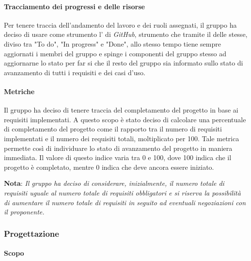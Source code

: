 \paragraph{Tracciamento dei progressi e delle risorse}
Per tenere traccia dell'andamento del lavoro e dei ruoli assegnati, il gruppo ha deciso di usare come strumento 
l' di \emph{GitHub}, strumento che tramite il  delle 
 stesse, diviso tra "To do", "In progress" e "Done", allo stesso tempo tiene sempre aggiornati i 
membri del gruppo e spinge i componenti del gruppo stesso ad aggiornarne lo stato per far si che il resto del gruppo 
sia informato sullo stato di avanzamento di tutti i requisiti e dei casi d'uso.

\paragraph{Metriche}

Il gruppo ha deciso di tenere traccia del completamento del progetto in base ai requisiti implementati. A questo scopo è 
stato deciso di calcolare una percentuale di completamento del progetto come il rapporto tra il numero di requisiti 
implementati e il numero dei requisiti totali, moltiplicato per 100. Tale metrica permette così di individuare lo stato 
di avanzamento del progetto in maniera immediata. Il valore di questo indice varia tra 0 e 100, dove 100 indica che il 
progetto è completato, mentre 0 indica che deve ancora essere iniziato.
\begin{center}
    \textbf{Nota}: \emph{Il gruppo ha deciso di considerare, inizialmente, il numero totale di requisiti uguale al numero totale di requisiti obbligatori e si riserva la 
    possibilità di aumentare il numero totale di requisiti in seguito ad eventuali negoziazioni con il proponente.}
\end{center}
 
\subsubsection{Progettazione}
 
\paragraph{Scopo}

